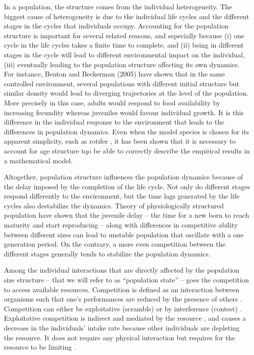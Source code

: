 In a population, the structure comes from the individual heterogeneity.
The biggest cause of heterogeneity is due to the individual life cycles and the
different stages in the cycles that individuals occupy. Accounting for
the population structure is important for several related reasons, and
especially because (i) one cycle in the life cycles takes a finite time to
complete, and (ii) being in different stages in the cycle will lead to different
environmental impact on the individual, (iii) eventually leading to the
population structure affecting its own dynamics. For instance, Benton and
Beckerman (2005) have shown that in the same controlled environment, several
populations with different initial structure but similar density would lead to
diverging trajectories at the level of the population. More precisely in this
case, adults would respond to food availability by increasing fecundity whereas
juveniles would favour individual growth. It is this difference in the
individual response to the environment that leads to the differences in
population dynamics. Even when the model species is chosen for its apparent
simplicity, such as rotifer \autocites{fussmann2005ecological}, it has
been shown that it is necessary to account for age structure tqo be able to
correctly describe the empirical results in a mathematical model.

Altogether, population structure influences the population dynamics because of
the delay imposed by the completion of the life cycle. Not only do
different stages respond differently to the environment, but the time lags
generated by the life cycles also destabilize the dynamics. Theory of
physiologically structured population have shown that the juvenile delay – the
time for a new born to reach maturity and start reproducing – along with
differences in competitive ability between different sizes can lead to unstable
population that oscillate with a one generation period. On the contrary,
a more even competition between the different stages generally tends to
stabilize the population dynamics.

Among the individual interactions that are directly affected by the population
size structure – that we will refer to as “population state” – goes the
competition to access available resources. Competition is defined as an
interaction between organisms such that one’s performances are reduced by the
presence of others
\autocites{volterra1931a,gause1932a,park1948a,park1954a,park1957a}.
Competition can either be exploitative (scramble) or by interference (contest)
\autocites{park1954a,park1962a,begon2009a}. Exploitative competition is indirect
and mediated by the resource
\autocites{goss-custard1980a,vance1984a,begon2009a}, and causes a decrease in
the individuals’ intake rate because other individuals are depleting the
resource. It does not require any physical interaction but requires for the
resource to be limiting \autocites{begon2009a}.


